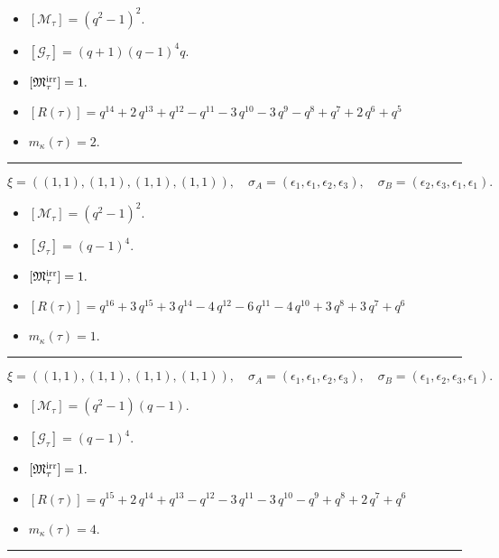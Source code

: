 \documentclass[10pt,a4paper]{amsart}
\begin{document}
\begin{itemize}
 \item $[\mathcal{M}_{\tau}] = {\left(q^{2} - 1\right)}^{2} .$

 \item $[\mathcal{G}_{\tau}] = {\left(q + 1\right)} {\left(q - 1\right)}^{4} q .$

 \item $[{\frak M}_{\tau}^{\textrm{irr}}] = 1 .$

 \item $[R(\tau)] = q^{14} + 2 \, q^{13} + q^{12} - q^{11} - 3 \, q^{10} - 3 \, q^{9} - q^{8} + q^{7} + 2 \, q^{6} + q^{5} $

 \item $m_{\kappa}(\tau) = 2 .$

 \end{itemize}
\noindent\rule{8cm}{0.4pt}

$$\xi = ({(1, 1), (1, 1)}, {(1, 1), (1, 1)}),\quad \sigma_A = ({{\epsilon_1}, {\epsilon_1}}, {{\epsilon_2}, {\epsilon_3}}),\quad \sigma_B = ({{\epsilon_2}, {\epsilon_3}}, {{\epsilon_1}, {\epsilon_1}}).$$

\begin{itemize}
 \item $[\mathcal{M}_{\tau}] = {\left(q^{2} - 1\right)}^{2} .$

 \item $[\mathcal{G}_{\tau}] = {\left(q - 1\right)}^{4} .$

 \item $[{\frak M}_{\tau}^{\textrm{irr}}] = 1 .$

 \item $[R(\tau)] = q^{16} + 3 \, q^{15} + 3 \, q^{14} - 4 \, q^{12} - 6 \, q^{11} - 4 \, q^{10} + 3 \, q^{8} + 3 \, q^{7} + q^{6} $

 \item $m_{\kappa}(\tau) = 1 .$

 \end{itemize}
\noindent\rule{8cm}{0.4pt}

$$\xi = ({(1, 1), (1, 1)}, {(1, 1), (1, 1)}),\quad \sigma_A = ({{\epsilon_1}, {\epsilon_1}}, {{\epsilon_2}, {\epsilon_3}}),\quad \sigma_B = ({{\epsilon_1}, {\epsilon_2}}, {{\epsilon_3}, {\epsilon_1}}).$$

\begin{itemize}
 \item $[\mathcal{M}_{\tau}] = {\left(q^{2} - 1\right)} {\left(q - 1\right)} .$

 \item $[\mathcal{G}_{\tau}] = {\left(q - 1\right)}^{4} .$

 \item $[{\frak M}_{\tau}^{\textrm{irr}}] = 1 .$

 \item $[R(\tau)] = q^{15} + 2 \, q^{14} + q^{13} - q^{12} - 3 \, q^{11} - 3 \, q^{10} - q^{9} + q^{8} + 2 \, q^{7} + q^{6} $

 \item $m_{\kappa}(\tau) = 4 .$

 \end{itemize}
\noindent\rule{8cm}{0.4pt}
\end{document}
